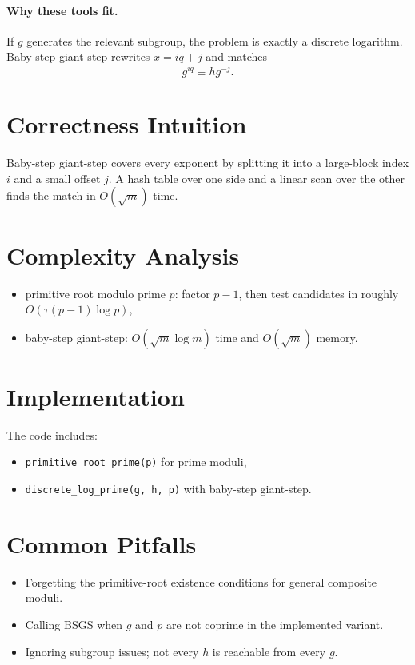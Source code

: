 \paragraph{Why these tools fit.}
If \(g\) generates the relevant subgroup, the problem is exactly a discrete logarithm. Baby-step giant-step rewrites
\(x = iq + j\) and matches
\[
g^{iq} \equiv h g^{-j}.
\]

\section*{Correctness Intuition}

Baby-step giant-step covers every exponent by splitting it into a large-block index \(i\) and a small offset \(j\). A
hash table over one side and a linear scan over the other finds the match in \(O(\sqrt{m})\) time.

\section*{Complexity Analysis}

\begin{itemize}
  \item primitive root modulo prime \(p\): factor \(p-1\), then test candidates in roughly \(O(\tau(p-1)\log p)\),
  \item baby-step giant-step: \(O(\sqrt{m}\log m)\) time and \(O(\sqrt{m})\) memory.
\end{itemize}

\section*{Implementation}

The code includes:

\begin{itemize}
  \item \texttt{primitive\_root\_prime(p)} for prime moduli,
  \item \texttt{discrete\_log\_prime(g, h, p)} with baby-step giant-step.
\end{itemize}

\section*{Common Pitfalls}

\begin{itemize}
  \item Forgetting the primitive-root existence conditions for general composite moduli.
  \item Calling BSGS when \(g\) and \(p\) are not coprime in the implemented variant.
  \item Ignoring subgroup issues; not every \(h\) is reachable from every \(g\).
\end{itemize}

